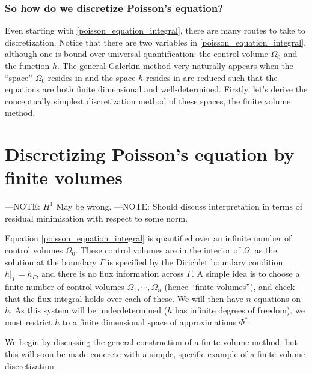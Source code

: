 \subsubsection{So how do we discretize Poisson's equation?}
Even starting with \eqref{poisson_equation_integral}, there are many routes to take to discretization.
Notice that there are two variables in \eqref{poisson_equation_integral}, although one is bound over universal quantification:
the control volume $\Omega_0$ and the function $h$.
The general Galerkin method very naturally appears when the ``space'' $\Omega_0$ resides in and the space $h$ resides in are reduced
such that the equations are both finite dimensional and well-determined. Firstly, let's derive the conceptually simplest
discretization method of these spaces, the finite volume method.


\section{Discretizing Poisson's equation by finite volumes}\label{discretizing_poisson}
---NOTE: $H^1$ May be wrong.
---NOTE: Should discuss interpretation in terms of residual minimisation with respect to some norm.

Equation \eqref{poisson_equation_integral} is quantified over an infinite number of control volumes $\Omega_0$.
These control volumes are in the interior of $\Omega$, as the solution at the boundary $\Gamma$ is specified by the Dirichlet boundary condition
$\left.h\right|_\Gamma = h_\Gamma$, and there is no flux information across $\Gamma$.
A simple idea is to choose a finite number of control volumes $\Omega_1,\cdots,\Omega_n$ (hence ``finite volumes''), and check that the flux integral holds over each of these.
We will then have $n$ equations on $h$. As this system will be underdetermined ($h$ has infinite degrees of freedom), we must
restrict $h$ to a finite dimensional space of approximations $\Phi^*$.

We begin by discussing the general construction of a finite volume method, but this will soon be made concrete with a simple, specific example of a 
finite volume discretization.


